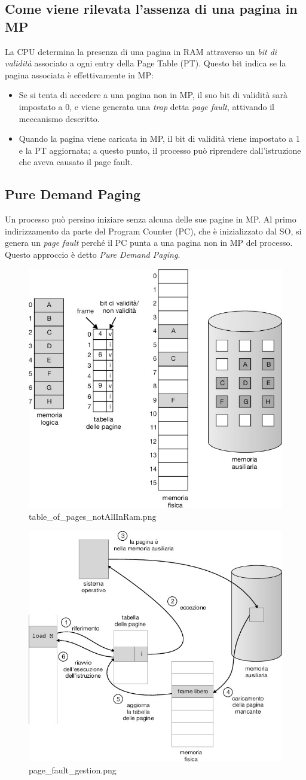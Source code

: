 \subsection*{Come viene rilevata l'assenza di una pagina in MP}
La CPU determina la presenza di una pagina in RAM attraverso un \emph{bit di validità} associato a ogni entry della Page Table (PT). Questo bit indica se la pagina associata è effettivamente in MP:
\begin{itemize}
    \item Se si tenta di accedere a una pagina non in MP, il suo bit di validità sarà impostato a 0, e viene generata una \emph{trap} detta \emph{page fault}, attivando il meccanismo descritto.
    \item Quando la pagina viene caricata in MP, il bit di validità viene impostato a 1 e la PT aggiornata; a questo punto, il processo può riprendere dall'istruzione che aveva causato il page fault.
\end{itemize}
\subsection*{Pure Demand Paging}
Un processo può persino iniziare senza alcuna delle sue pagine in MP. Al primo indirizzamento da parte del Program Counter (PC), che è inizializzato dal SO, si genera un \emph{page fault} perché il PC punta a una pagina non in MP del processo. Questo approccio è detto \emph{Pure Demand Paging}.

\begin{figure}[h] \centering \includegraphics[width=0.25\linewidth]{images/table_of_pages_notAllInRam.png} \caption{table_of_pages_notAllInRam.png} \label{fig:10.4} \end{figure}
\begin{figure}[h] \centering \includegraphics[width=0.25\linewidth]{images/page_fault_gestion.png} \caption{page_fault_gestion.png} \label{fig:10.5} \end{figure}

